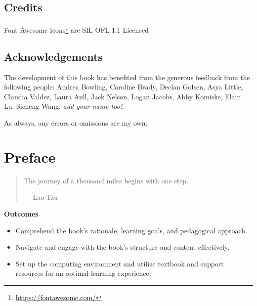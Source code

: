 \documentclass[
  letterpaper,
]{latex/krantz}
\providecommand{\tightlist}{%
  \setlength{\itemsep}{0pt}\setlength{\parskip}{0pt}}\usepackage{longtable,booktabs,array}
\theoremstyle{definition}
\theoremstyle{remark}
\DeclareRobustCommand{\href}[2]{#2\footnote{\url{#1}}}
\begin{document}
\section*{Credits}\label{credits}


\href{https://fontawesome.com/}{Font Awesome Icons} are SIL OFL 1.1
Licensed

\section*{Acknowledgements}\label{acknowledgements}


The development of this book has benefited from the generous feedback
from the following people: Andrea Bowling, Caroline Brady, Declan
Golsen, Asya Little, Claudia Valdez, Laura Aull, Jack Nelson, Logan
Jacobs, Abby Komiske, Elain Lu, Sicheng Wang, \emph{add your name too!}.

As always, any errors or omissions are my own.


\chapter*{Preface}\label{sec-preface}


\begin{quote}
The journey of a thousand miles begins with one step.

--- Lao Tzu
\end{quote}

\begin{tcolorbox}[enhanced jigsaw, bottomrule=.15mm, leftrule=.75mm, toprule=.15mm, breakable, colframe=quarto-callout-color-frame, arc=.35mm, left=2mm, rightrule=.15mm, opacityback=0, colback=white]

\textbf{ Outcomes}

\begin{itemize}
\tightlist
\item
  Comprehend the book's rationale, learning goals, and pedagogical
  approach.
\item
  Navigate and engage with the book's structure and content effectively.
\item
  Set up the computing environment and utilize textbook and support
  resources for an optimal learning experience.
\end{itemize}

\end{tcolorbox}
\end{document}
